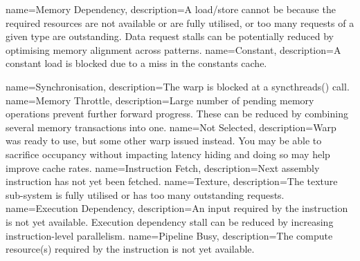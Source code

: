 {
  name=Memory Dependency,
  description={A load/store cannot be because the required resources are not available or are fully utilised, or too many requests of a given type are outstanding. Data request stalls can be potentially reduced by optimising memory alignment across patterns.}
}
{
  name=Constant,
  description={A constant load is blocked due to a miss in the constants cache.}
}

{
  name=Synchronisation,
  description={The warp is blocked at a \twound syncthreads() call.}
}
{
  name=Memory Throttle,
  description={Large number of pending memory operations prevent further forward progress. These can be reduced by combining several memory transactions into one.}
}
{
  name=Not Selected,
  description={Warp was ready to use, but some other warp issued instead. You may be able to sacrifice occupancy without impacting latency hiding and doing so may help improve cache rates.}
}
{
  name=Instruction Fetch,
  description={Next assembly instruction has not yet been fetched.}
}
{
  name=Texture,
  description={The texture sub-system is fully utilised or has too many outstanding requests.}
}
{
  name=Execution Dependency,
  description={An input required by the instruction is not yet available. Execution dependency stall can be reduced by increasing instruction-level parallelism.}
}
{
  name=Pipeline Busy,
  description={The compute resource(s) required by the instruction is not yet available.}
}





